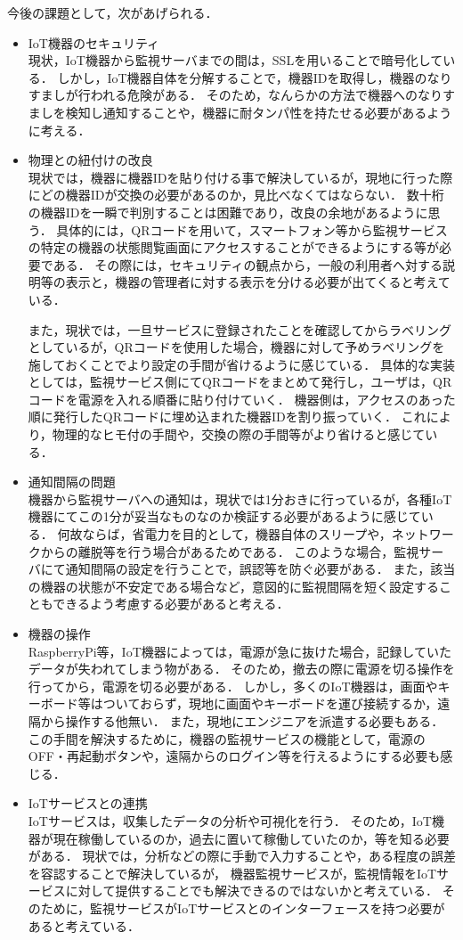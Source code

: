 今後の課題として，次があげられる．
\begin{itemize}
\item IoT機器のセキュリティ\\
	現状，IoT機器から監視サーバまでの間は，SSLを用いることで暗号化している．
	しかし，IoT機器自体を分解することで，機器IDを取得し，機器のなりすましが行われる危険がある．
	そのため，なんらかの方法で機器へのなりすましを検知し通知することや，機器に耐タンパ性を持たせる必要があるように考える．
\item 物理との紐付けの改良\\
	現状では，機器に機器IDを貼り付ける事で解決しているが，現地に行った際にどの機器IDが交換の必要があるのか，見比べなくてはならない．
	数十桁の機器IDを一瞬で判別することは困難であり，改良の余地があるように思う．
	具体的には，QRコードを用いて，スマートフォン等から監視サービスの特定の機器の状態閲覧画面にアクセスすることができるようにする等が必要である．
	その際には，セキュリティの観点から，一般の利用者へ対する説明等の表示と，機器の管理者に対する表示を分ける必要が出てくると考えている．

	また，現状では，一旦サービスに登録されたことを確認してからラベリングとしているが，QRコードを使用した場合，機器に対して予めラベリングを施しておくことでより設定の手間が省けるように感じている．
	具体的な実装としては，監視サービス側にてQRコードをまとめて発行し，ユーザは，QRコードを電源を入れる順番に貼り付けていく．
	機器側は，アクセスのあった順に発行したQRコードに埋め込まれた機器IDを割り振っていく．
	これにより，物理的なヒモ付の手間や，交換の際の手間等がより省けると感じている．
\item  通知間隔の問題\\
	機器から監視サーバへの通知は，現状では1分おきに行っているが，各種IoT機器にてこの1分が妥当なものなのか検証する必要があるように感じている．
	何故ならば，省電力を目的として，機器自体のスリープや，ネットワークからの離脱等を行う場合があるためである．
	このような場合，監視サーバにて通知間隔の設定を行うことで，誤認等を防ぐ必要がある．
	また，該当の機器の状態が不安定である場合など，意図的に監視間隔を短く設定することもできるよう考慮する必要があると考える．
\item 機器の操作\\
	RaspberryPi等，IoT機器によっては，電源が急に抜けた場合，記録していたデータが失われてしまう物がある．
	そのため，撤去の際に電源を切る操作を行ってから，電源を切る必要がある．
	しかし，多くのIoT機器は，画面やキーボード等はついておらず，現地に画面やキーボードを運び接続するか，遠隔から操作する他無い．
	また，現地にエンジニアを派遣する必要もある．
	この手間を解決するために，機器の監視サービスの機能として，電源のOFF・再起動ボタンや，遠隔からのログイン等を行えるようにする必要も感じる．
\item IoTサービスとの連携\\
	IoTサービスは，収集したデータの分析や可視化を行う．
	そのため，IoT機器が現在稼働しているのか，過去に置いて稼働していたのか，等を知る必要がある．
	現状では，分析などの際に手動で入力することや，ある程度の誤差を容認することで解決しているが，
	機器監視サービスが，監視情報をIoTサービスに対して提供することでも解決できるのではないかと考えている．
	そのために，監視サービスがIoTサービスとのインターフェースを持つ必要があると考えている．
\end{itemize}

